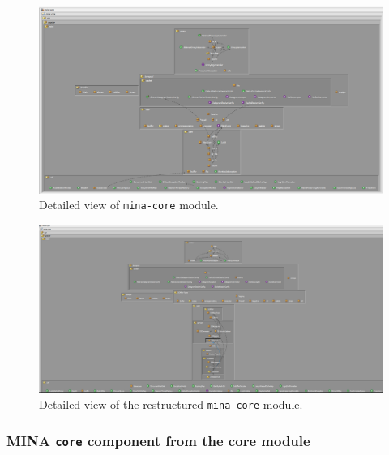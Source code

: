 \begin{landscape}
\begin{figure}
    \centering
    \includegraphics[width=\linewidth]{images/MINA_core_extended_initial.png}
    \caption{Detailed view of \texttt{mina-core} module.}
    \label{fig:mina_core_initial_detailed}
\end{figure}
\end{landscape}

\begin{landscape}
\begin{figure}
    \centering
    \includegraphics[scale=0.4]{images/MINA_core_extended_restructured.png}
    \caption{Detailed view of the restructured \texttt{mina-core} module.}
\end{figure}
\end{landscape}

\subsubsection{MINA \texttt{core} component from the core module}

